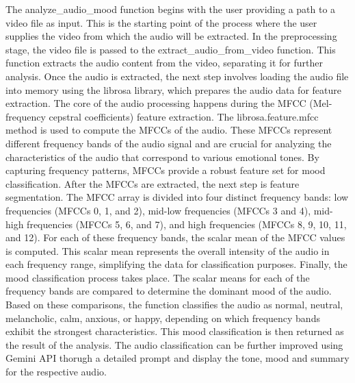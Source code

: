 \noindent
The analyze\_audio\_mood function begins with the user providing a path to a video file as input. This is the starting point of the process where the user supplies the video from which the audio will be extracted. In the preprocessing stage, the video file is passed to the extract\_audio\_from\_video function. This function extracts the audio content from the video, separating it for further analysis. Once the audio is extracted, the next step involves loading the audio file into memory using the librosa library, which prepares the audio data for feature extraction. The core of the audio processing happens during the MFCC (Mel-frequency cepstral coefficients) feature extraction. The librosa.feature.mfcc method is used to compute the MFCCs of the audio. These MFCCs represent different frequency bands of the audio signal and are crucial for analyzing the characteristics of the audio that correspond to various emotional tones. By capturing frequency patterns, MFCCs provide a robust feature set for mood classification. After the MFCCs are extracted, the next step is feature segmentation. The MFCC array is divided into four distinct frequency bands: low frequencies (MFCCs 0, 1, and 2), mid-low frequencies (MFCCs 3 and 4), mid-high frequencies (MFCCs 5, 6, and 7), and high frequencies (MFCCs 8, 9, 10, 11, and 12). For each of these frequency bands, the scalar mean of the MFCC values is computed. This scalar mean represents the overall intensity of the audio in each frequency range, simplifying the data for classification purposes. Finally, the mood classification process takes place. The scalar means for each of the frequency bands are compared to determine the dominant mood of the audio. Based on these comparisons, the function classifies the audio as normal, neutral, melancholic, calm, anxious, or happy, depending on which frequency bands exhibit the strongest characteristics. This mood classification is then returned as the result of the analysis. The audio classification can be further improved using Gemini API thorugh a detailed prompt and display the tone, mood and summary for the respective audio.

\vspace{1em}

